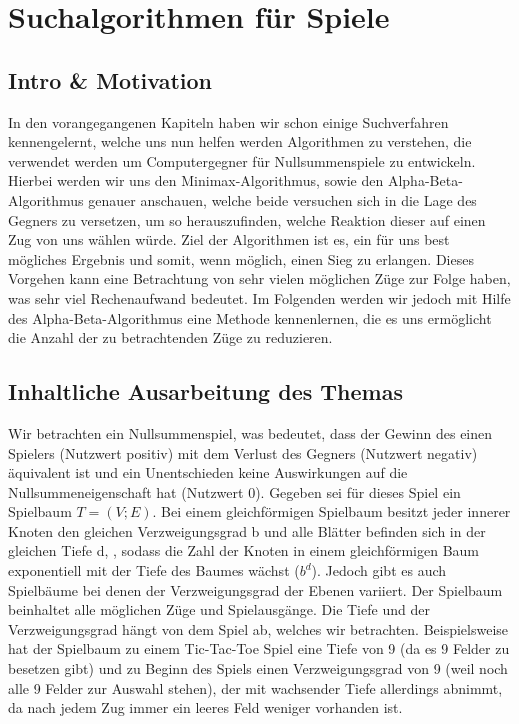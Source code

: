 
\chapter{Suchalgorithmen für Spiele}

\usetikzlibrary{calc}
\usetikzlibrary{positioning}
\usetikzlibrary{matrix}



\section{Intro \& Motivation}

In den vorangegangenen Kapiteln haben wir schon einige Suchverfahren kennengelernt, welche uns nun helfen werden Algorithmen zu verstehen, die verwendet werden um Computergegner für Nullsummenspiele zu entwickeln. Hierbei werden wir uns den Minimax-Algorithmus, sowie den Alpha-Beta-Algorithmus genauer anschauen, welche beide versuchen sich in die Lage des Gegners zu versetzen, um so  herauszufinden, welche Reaktion dieser auf einen Zug von uns wählen würde. Ziel der Algorithmen ist es, ein für uns best mögliches Ergebnis und somit, wenn möglich, einen Sieg zu erlangen. Dieses Vorgehen kann eine Betrachtung von sehr vielen möglichen Züge zur Folge haben, was sehr viel Rechenaufwand bedeutet. Im Folgenden werden wir jedoch  mit Hilfe des Alpha-Beta-Algorithmus eine Methode kennenlernen, die es uns ermöglicht die Anzahl der zu betrachtenden Züge zu reduzieren.



\section{Inhaltliche Ausarbeitung des Themas}

Wir betrachten ein Nullsummenspiel, was bedeutet, dass der Gewinn des einen Spielers (Nutzwert positiv) mit dem Verlust des Gegners (Nutzwert negativ) äquivalent ist und ein Unentschieden keine Auswirkungen auf die Nullsummeneigenschaft hat (Nutzwert 0).
Gegeben sei für dieses Spiel ein Spielbaum $T = (V;E)$. Bei einem gleichförmigen Spielbaum besitzt jeder innerer Knoten den gleichen Verzweigungsgrad b und alle Blätter befinden sich in der gleichen Tiefe d, , sodass die Zahl der Knoten in einem gleichförmigen Baum exponentiell mit der Tiefe des Baumes wächst ($b^d$). Jedoch gibt es auch Spielbäume bei denen der Verzweigungsgrad der Ebenen variiert.
Der Spielbaum beinhaltet alle möglichen Züge und Spielausgänge. Die Tiefe und der Verzweigungsgrad hängt von dem Spiel ab, welches wir betrachten. Beispielsweise hat der Spielbaum zu einem Tic-Tac-Toe Spiel eine Tiefe von 9 (da es 9 Felder zu besetzen gibt) und zu Beginn des Spiels einen Verzweigungsgrad von 9 (weil noch alle 9 Felder zur Auswahl stehen), der mit wachsender Tiefe allerdings abnimmt, da nach jedem Zug immer ein leeres Feld weniger vorhanden ist.



